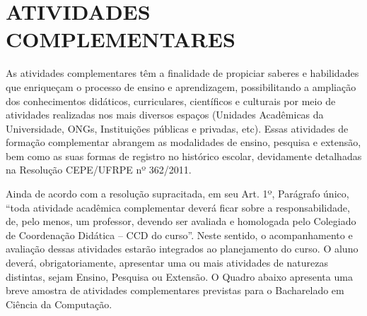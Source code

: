 \chapter{ATIVIDADES COMPLEMENTARES}

As atividades complementares têm a finalidade de propiciar saberes e habilidades que enriqueçam o processo de ensino e aprendizagem, possibilitando a ampliação dos conhecimentos didáticos, curriculares, científicos e culturais por meio de atividades realizadas nos mais diversos espaços (Unidades Acadêmicas da Universidade, ONGs, Instituições públicas e privadas, etc). Essas atividades de formação complementar abrangem as modalidades de ensino, pesquisa e extensão, bem como as suas formas de registro no histórico escolar, devidamente detalhadas na Resolução CEPE/UFRPE nº 362/2011. 

Ainda de acordo com a resolução supracitada, em seu Art. 1º, Parágrafo único, “toda atividade acadêmica complementar deverá ficar sobre a responsabilidade, de, pelo menos, um professor, devendo ser avaliada e homologada pelo Colegiado de Coordenação Didática – CCD do curso”. Neste sentido, o acompanhamento e avaliação dessas atividades estarão integrados ao planejamento do curso. O aluno deverá, obrigatoriamente, apresentar uma ou mais atividades de naturezas distintas, sejam Ensino, Pesquisa ou Extensão. O Quadro abaixo apresenta uma breve amostra de atividades complementares previstas para o Bacharelado em Ciência da Computação.

